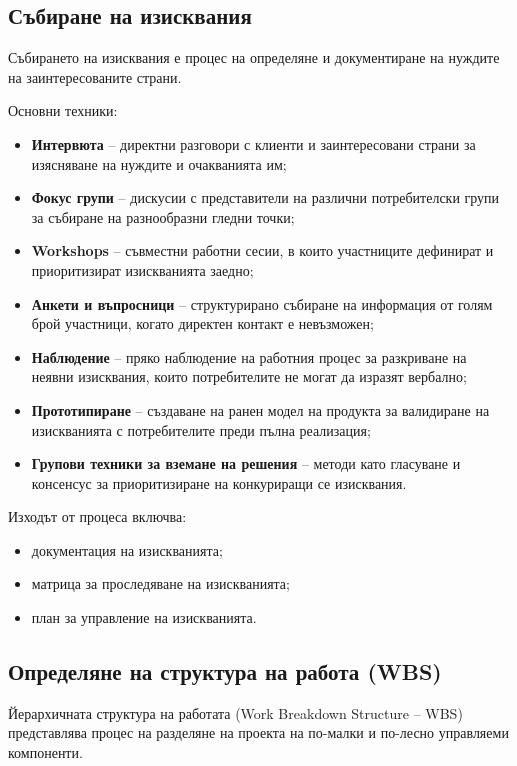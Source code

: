 \documentclass{scrartcl}
\begin{document}
\begin{FlushLeft}
\subsection{Събиране на изисквания}

Събирането на изисквания е процес на определяне и документиране на нуждите на заинтересованите страни.

Основни техники:

\begin{itemize}
    \item \textbf{Интервюта} – директни разговори с клиенти и заинтересовани страни за изясняване на нуждите и очакванията им;
    \item \textbf{Фокус групи} – дискусии с представители на различни потребителски групи за събиране на разнообразни гледни точки;
    \item \textbf{Workshops} – съвместни работни сесии, в които участниците дефинират и приоритизират изискванията заедно;
    \item \textbf{Анкети и въпросници} – структурирано събиране на информация от голям брой участници, когато директен контакт е невъзможен;
    \item \textbf{Наблюдение} – пряко наблюдение на работния процес за разкриване на неявни изисквания, които потребителите не могат да изразят вербално;
    \item \textbf{Прототипиране} – създаване на ранен модел на продукта за валидиране на изискванията с потребителите преди пълна реализация;
    \item \textbf{Групови техники за вземане на решения} – методи като гласуване и консенсус за приоритизиране на конкуриращи се изисквания.
\end{itemize}

Изходът от процеса включва:

\begin{itemize}
    \item документация на изискванията;
    \item матрица за проследяване на изискванията;
    \item план за управление на изискванията.
\end{itemize}

\subsection{Определяне на структура на работа (WBS)}

Йерархичната структура на работата (Work Breakdown Structure – WBS) представлява процес на разделяне на проекта на по-малки и по-лесно управляеми компоненти.


\end{FlushLeft}
\end{document}

